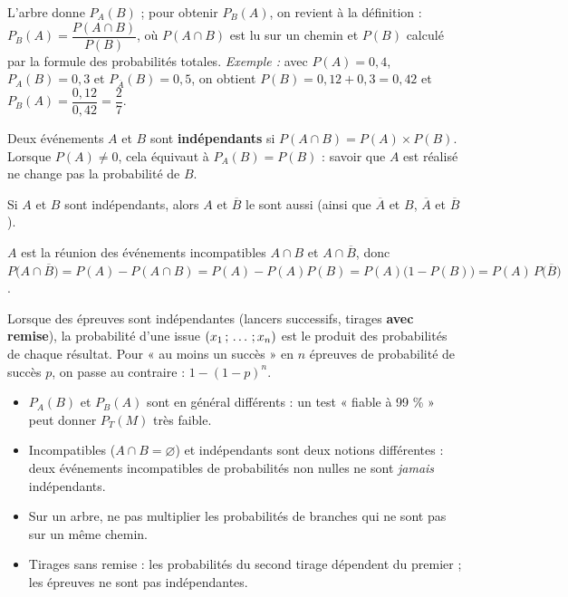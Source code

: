 \begin{savoirfaire}
L'arbre donne $P_A(B)$ ; pour obtenir $P_B(A)$, on revient à la définition : $P_B(A)=\dfrac{P(A\cap B)}{P(B)}$, où $P(A\cap B)$
est lu sur un chemin et $P(B)$ calculé par la formule des probabilités totales. \emph{Exemple :} avec $P(A)=0{,}4$, $P_A(B)=0{,}3$
et $P_{\overline A}(B)=0{,}5$, on obtient $P(B)=0{,}12+0{,}3=0{,}42$ et $P_B(A)=\dfrac{0{,}12}{0{,}42}=\dfrac27$.
\end{savoirfaire}


\begin{definition}
Deux événements $A$ et $B$ sont \textbf{indépendants} si $P(A\cap B)=P(A)\times P(B)$. Lorsque $P(A)\neq0$, cela équivaut à
$P_A(B)=P(B)$ : savoir que $A$ est réalisé ne change pas la probabilité de $B$.
\end{definition}

\begin{propriete}
Si $A$ et $B$ sont indépendants, alors $A$ et $\overline B$ le sont aussi (ainsi que $\overline A$ et $B$, $\overline A$ et $\overline B$).
\end{propriete}

\begin{demonstration}
$A$ est la réunion des événements incompatibles $A\cap B$ et $A\cap\overline B$, donc
$P\big(A\cap\overline B\big)=P(A)-P(A\cap B)=P(A)-P(A)P(B)=P(A)\big(1-P(B)\big)=P(A)\,P\big(\overline B\big)$.
\end{demonstration}

\begin{savoirfaire}
Lorsque des épreuves sont indépendantes (lancers successifs, tirages \textbf{avec remise}), la probabilité d'une issue
$(x_1\,{;}\,\dots\,{;}\, x_n)$ est le produit des probabilités de chaque résultat. Pour « au moins un succès » en $n$ épreuves de
probabilité de succès $p$, on passe au contraire : $1-(1-p)^{n}$.
\end{savoirfaire}

\begin{attention}
\begin{itemize}[label={\color{otOrange}\textbullet},leftmargin=1.4em,itemsep=0.6mm,topsep=0.5mm]
  \item $P_A(B)$ et $P_B(A)$ sont en général différents : un test « fiable à 99 \% » peut donner $P_T(M)$ très faible.
  \item Incompatibles ($A\cap B=\varnothing$) et indépendants sont deux notions différentes : deux événements incompatibles de
    probabilités non nulles ne sont \emph{jamais} indépendants.
  \item Sur un arbre, ne pas multiplier les probabilités de branches qui ne sont pas sur un même chemin.
  \item Tirages sans remise : les probabilités du second tirage dépendent du premier ; les épreuves ne sont pas indépendantes.
\end{itemize}
\end{attention}

